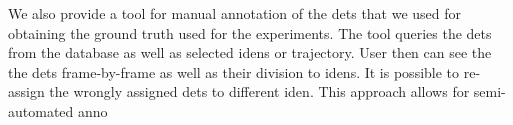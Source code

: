 We also provide a tool for manual annotation of the \glspl{det} that we used for obtaining the ground truth used for the experiments. The tool queries the \glspl{det} from the database as well as selected \glspl{iden} or trajectory. User then can see the the \glspl{det} frame-by-frame as well as their division to \glspl{iden}. It is possible to re-assign the wrongly assigned \glspl{det} to different \gls{iden}. This approach allows for semi-automated anno